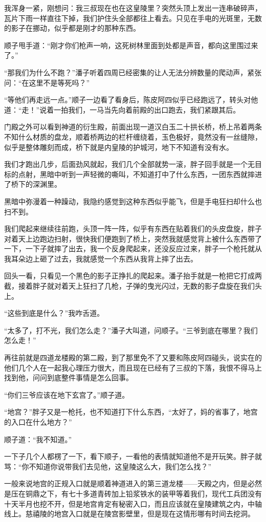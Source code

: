 我浑身一紧，刚想问：我三叔现在也在这皇陵里？突然头顶上发出一连串破碎声，瓦片下雨一样直往下掉，我们护住头全部都往上看去。只见在手电的光斑里，无数的影子在挪动，似乎都是刚才的那种东西。

顺子甩手道：“刚才你们枪声一响，这死树林里面到处都是声音，都向这里围过来了。”

“那我们为什么不跑？”潘子听着四周已经密集的让人无法分辨数量的爬动声，紧张问：“在这里不是等死吗？”

“等他们再走远一点。”顺子一边看了看身后，陈皮阿四似乎已经跑远了，转头对他道：“走！”说着一拍我们，一马当先向着前殿的出口跑去，我们紧跟其后。

门殿之外可以看到神道的衍生殿，前面出现一道汉白玉二十拱长桥，桥上吊着两条不知什么材质的盘龙，顺着桥两边的栏杆缠绕着，玉色极好，竟然没有一丝缝隙，似乎是整体雕刻而成，桥下就是内皇陵的护城河，地下不知道有没有水。

我们才跑出几步，后面劲风就起，我们几个全部就势一滚，胖子回手就是一个无目标的点射，黑暗中听到一声轻微的嘶叫，不知道打中了什么东西，一团东西就摔进了桥下的深渊里。

黑暗中弥漫着一种躁动，我隐约感觉到这种东西似乎能飞，但是手电狂扫却什么也扫不到。

我们爬起来继续往前跑，头顶一阵一阵，似乎有东西在贴着我们的头皮盘旋，胖子对着天上边跑边扫射，很快我们便跑到了桥上，突然我就感觉背上被什么东西带了一下，一下子就摔了出去，我一个反身爬起来，还没反应过来，胖子一个枪托就从我耳朵边上砸了过去，我就感觉一个东西从我背上摔了出去。

回头一看，只看见一个黑色的影子正挣扎的爬起来。潘子抬手就是一枪把它打成两截，接着胖子就对着天上狂扫了几枪，子弹的曳光闪过，无数的影子盘旋在我们头上。

“这些到底是什么？”我咋舌道。

“太多了，打不光，我们怎么走？”潘子大叫道，问顺子。“三爷到底在哪里？我们怎么走！”

再往前就是四道龙楼殿的第二殿，到了那里免不了又要和陈皮阿四碰头，说实在的他们几个人在一起我心理压力很大，而且现在已经有了三叔的下落，我恨不得马上找到他，问问到底整件事情是怎么回事。

“你们三爷应该在地下玄宫了。”顺子道。

“地宫？”胖子又是一枪托，也不知道打下什么东西，“太好了，妈的省事了，地宫的入口在什么地方？”

顺子道：“我不知道。”

一下子几个人都楞了一下，看下顺子，一看他的表情就知道他不是开玩笑。胖子就骂：“你不知道你说带我们去见他，这皇陵这么大，我们怎么找？”

一般来说地宫的正规入口就是顺着神道进入的第三道龙楼——天殿之内，但是必然是压在铜鼎之下，有七十多道青砖加上铅浆铁水的装甲等着我们，现代工兵团没有十天半月也挖不开，但是地宫肯定有秘密入口，而且应该就在皇陵建筑之内，中轴线上。慈禧陵的地宫入口就是在陵宫影壁里，但是现在这情形哪有时间去挖洞。

